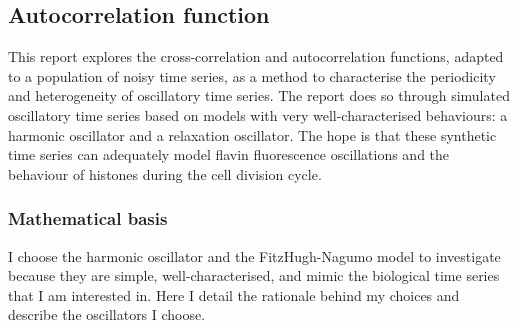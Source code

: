 \subsection{Autocorrelation function}
\label{subsec:analysis-characterisation-acf}

This report explores the cross-correlation and autocorrelation functions, adapted to a population of noisy time series, as a method to characterise the periodicity and heterogeneity of oscillatory time series.  The report does so through simulated oscillatory time series based on models with very well-characterised behaviours: a harmonic oscillator and a relaxation oscillator.  The hope is that these synthetic time series can adequately model flavin fluorescence oscillations and the behaviour of histones during the cell division cycle.

\subsubsection{Mathematical basis}
\label{subsubsec:analysis-correlation-maths}

I choose the harmonic oscillator and the FitzHugh-Nagumo model to investigate because they are simple, well-characterised, and mimic the biological time series that I am interested in.  Here I detail the rationale behind my choices and describe the oscillators I choose.


